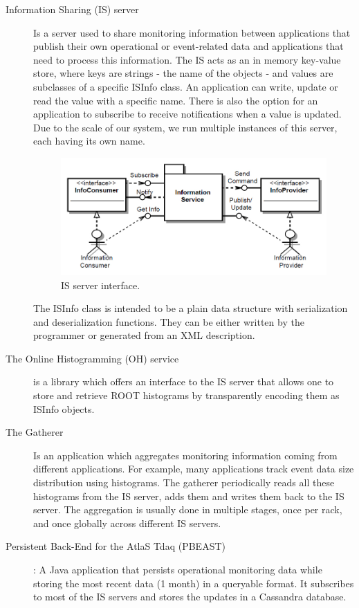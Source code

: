\begin{description}
\item[Information Sharing (IS) server \citep{kolosinformation}]  Is a server used to share monitoring information between applications that publish their own operational or event-related data and applications that need to process this information. The IS acts as an in memory key-value store, where keys are strings - the name of the objects - and values are subclasses of a specific ISInfo class. An application can write, update or read the value with a specific name. There is also the option for an application to subscribe to receive notifications when a value is updated. Due to the scale of our system, we run multiple instances of this server, each having its own name.

\begin{figure}[ht!]
\centering
\includegraphics[scale=0.44]{Images/IS.png}
\caption{IS server interface.}
\end{figure}


The ISInfo class is intended to be a plain data structure with serialization and deserialization functions. They can be either written by the programmer or generated from an XML description.

\item[The Online Histogramming (OH) service \citep{kolosoh}] is a library which offers an interface to the IS server that allows one to store and retrieve ROOT histograms by transparently encoding them as ISInfo objects.

\item[The Gatherer \citep{renkel2010gatherer}] Is an application which aggregates monitoring information coming from different applications. For example, many applications track event data size distribution using histograms. The gatherer periodically reads all these histograms from the IS server, adds them and writes them back to the IS server. The aggregation is usually done in multiple stages, once per rack, and once globally across different IS servers. 

\item[Persistent Back-End for the AtlaS Tdaq (PBEAST) \citep{sicoe2012persistent}]: A Java application that persists operational monitoring data while storing the most recent data (1 month) in a queryable format. It subscribes to most of the IS servers and stores the updates in a Cassandra database.

\end{description}

